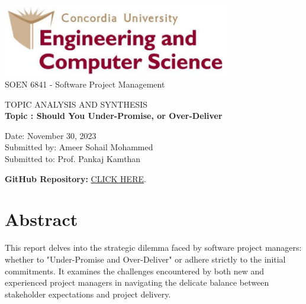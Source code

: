 \documentclass[12pt]{article}
\begin{document}
\begin{titlepage}
\begin{center}
\includegraphics[width=10cm]{concordia_comp.png}\\
\vspace{2cm}
{\fontsize{20}{10}\selectfont  SOEN 6841 - Software Project Management}\\ 
\vspace{1cm}

{\fontsize{14}{8}\selectfont 
TOPIC ANALYSIS AND SYNTHESIS }\\ 
\vspace{1cm}
{\fontsize{20}{10}\selectfont \textbf{
Topic :  Should You 
Under-Promise, 
or Over-Deliver }}\\ 
\vspace{1cm}


{\fontsize{17}{10}\selectfont Date: November 30, 2023} \\
\vspace{1cm}
{\fontsize{17}{10}\selectfont Submitted by: Ameer Sohail Mohammed} \\
\vspace{1cm}
{\fontsize{17}{10}\selectfont Submitted to: Prof. Pankaj Kamthan} \\
\vspace{1cm}
{\fontsize{20}{10}\selectfont 
\begin{center}
				\textbf{GitHub Repository:} \href{https://github.com/AmeerSohai312/SOEN-6841}{CLICK HERE}.

			\end{center}
\vspace{1cm} 
}
\end{center}

\end{titlepage}

\pagebreak

\newpage

\section{Abstract}

This report delves into the strategic dilemma faced by software project managers: whether to "Under-Promise and Over-Deliver" or adhere strictly to the initial commitments. It examines the challenges encountered by both new and experienced project managers in navigating the delicate balance between stakeholder expectations and project delivery.
\end{document}
